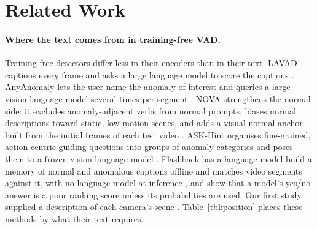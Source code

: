\documentclass[a4paper,fleqn]{cas-sc}
\begin{document}
\section{Related Work}
\label{sec:related}

\paragraph{Where the text comes from in training-free VAD.}
Training-free detectors differ less in their encoders than in their text. LAVAD
captions every frame and asks a large language model to score the captions
\citep{zanella2024lavad}. AnyAnomaly lets the user name the anomaly of interest and
queries a large vision-language model several times per segment
\citep{anyanomaly2025}. NOVA strengthens the normal side: it excludes anomaly-adjacent verbs from normal
prompts, biases normal descriptions toward static, low-motion scenes, and adds a
visual normal anchor built from the initial frames of each test video
\citep{yin2026nova}. ASK-Hint organises fine-grained, action-centric guiding questions into groups of
anomaly categories and poses them to a frozen vision-language model
\citep{zou2026askhint}. Flashback has a language model build a memory of normal and
anomalous captions offline and matches video segments against it, with no language
model at inference \citep{lee2025flashback}, and \citet{song2026vlmanswer} show that a model's yes/no
answer is a poor ranking score unless its probabilities are used. Our first study
supplied a description of each camera's scene \citep{sarangi2026concept}.
Table~\ref{tbl:position} places these methods by what their text requires.
\end{document}
